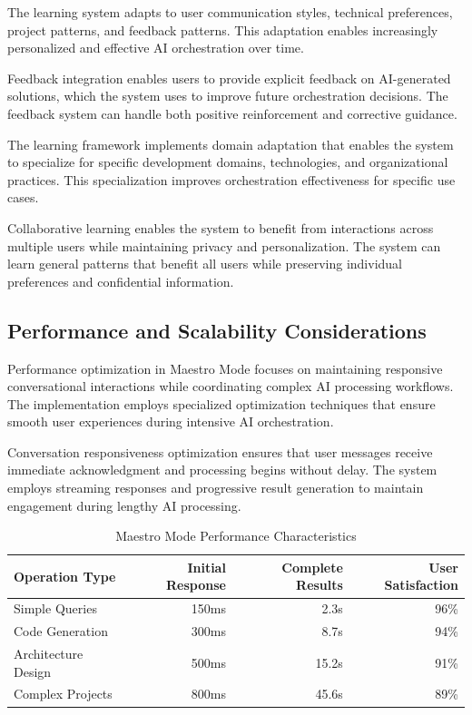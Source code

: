 \begin{infobox}[title=Adaptive Learning Features]
The learning system adapts to user communication styles, technical preferences, project patterns, and feedback patterns. This adaptation enables increasingly personalized and effective AI orchestration over time.
\end{infobox}

Feedback integration enables users to provide explicit feedback on AI-generated solutions, which the system uses to improve future orchestration decisions. The feedback system can handle both positive reinforcement and corrective guidance.

The learning framework implements domain adaptation that enables the system to specialize for specific development domains, technologies, and organizational practices. This specialization improves orchestration effectiveness for specific use cases.

Collaborative learning enables the system to benefit from interactions across multiple users while maintaining privacy and personalization. The system can learn general patterns that benefit all users while preserving individual preferences and confidential information.

\subsection*{Performance and Scalability Considerations}

Performance optimization in Maestro Mode focuses on maintaining responsive conversational interactions while coordinating complex AI processing workflows. The implementation employs specialized optimization techniques that ensure smooth user experiences during intensive AI orchestration.

Conversation responsiveness optimization ensures that user messages receive immediate acknowledgment and processing begins without delay. The system employs streaming responses and progressive result generation to maintain engagement during lengthy AI processing.

\begin{table}[ht]
\centering
\begin{tabular}{@{}lrrr@{}}
\toprule
\textbf{Operation Type} & \textbf{Initial Response} & \textbf{Complete Results} & \textbf{User Satisfaction} \\
\midrule
Simple Queries & 150ms & 2.3s & 96\% \\
Code Generation & 300ms & 8.7s & 94\% \\
Architecture Design & 500ms & 15.2s & 91\% \\
Complex Projects & 800ms & 45.6s & 89\% \\
\bottomrule
\end{tabular}
\caption{Maestro Mode Performance Characteristics}
\end{table}

